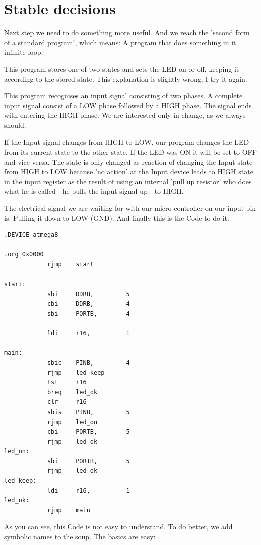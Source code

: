 \section{Stable decisions}

Next step we need to do something more useful. And we reach the 'second form of a standard program', which means: A program that does something in it infinite loop.

This program stores one of two states and sets the LED on or off, keeping it according to the stored state. This explanation is slightly wrong. I try it again.

This program recognises an input signal consisting of two phases. A complete input signal consist of a LOW phase followed by a HIGH phase. The signal ends with entering the HIGH phase. We are interested only in change, as we always should.

If the Input signal changes from HIGH to LOW, our program changes the LED from its current state to the other state. If the LED was ON it will be set to OFF and vice versa. The state is only changed as reaction of changing the Input state from HIGH to LOW because 'no action' at the Input device leads to HIGH state in the input register as the result of using an internal 'pull up resistor' who does what he is called - he pulls the input signal up - to HIGH.

The electrical signal we are waiting for with our micro controller on our input pin is: Pulling it down to LOW (GND). And finally this is the Code to do it:

\begin{lstlisting}
.DEVICE atmega8

.org 0x0000
            rjmp    start

start:
            sbi     DDRB,         5
            cbi     DDRB,         4
            sbi     PORTB,        4

            ldi     r16,          1

main:
            sbic    PINB,         4
            rjmp    led_keep
            tst     r16
            breq    led_ok
            clr     r16
            sbis    PINB,         5
            rjmp    led_on
            cbi     PORTB,        5
            rjmp    led_ok
led_on:
            sbi     PORTB,        5
            rjmp    led_ok
led_keep:
            ldi     r16,          1
led_ok:
            rjmp    main
\end{lstlisting}


As you can see, this Code is not easy to understand. To do better, we add symbolic names to the soup. The basics are easy:


